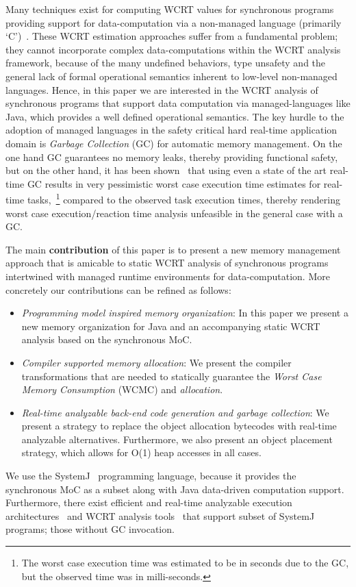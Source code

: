Many techniques exist for computing WCRT values for synchronous programs
providing support for data-computation via a non-managed language
(primarily `C')~\cite{boldt07,proop10}. These WCRT estimation approaches
suffer from a fundamental problem; they cannot incorporate complex
data-computations within the WCRT analysis framework, because of the
many undefined behaviors, type unsafety and the general lack of formal
operational semantics inherent to low-level non-managed
languages. Hence, in this paper we are interested in the WCRT analysis
of synchronous programs that support data computation via
managed-languages like Java, which provides a well defined operational
semantics. The key hurdle to the adoption of managed languages in the
safety critical hard real-time application domain is \textit{Garbage
  Collection} (GC) for automatic memory management. On the one hand GC
guarantees no memory leaks, thereby providing functional safety, but on
the other hand, it has been shown~\cite{puffitsch2013design} that using
even a state of the art real-time GC results in very pessimistic worst
case execution time estimates for real-time tasks,~\footnote{The worst
  case execution time was estimated to be in seconds due to the GC, but
  the observed time was in milli-seconds.} compared to the observed task
execution times, thereby rendering worst case execution/reaction time
analysis unfeasible in the general case with a GC.

The main \textbf{contribution} of this paper is to present a new memory
management approach that is amicable to static WCRT analysis of
synchronous programs intertwined with managed runtime environments for
data-computation. More concretely our contributions can be refined as
follows:

\begin{itemize}
\item \textit{Programming model inspired memory organization}: In this
  paper we present a new memory organization for Java and an
  accompanying static WCRT analysis based on the synchronous MoC.
\item \textit{Compiler supported memory allocation}: We present the
  compiler transformations that are needed to statically guarantee the
  \textit{Worst Case Memory Consumption} (WCMC) and \textit{allocation}.
\item \textit{Real-time analyzable back-end code generation and garbage
    collection}: We present a strategy to replace the object allocation
  bytecodes with real-time analyzable alternatives. Furthermore, we also
  present an object placement strategy, which allows for O(1) heap
  accesses in all cases.
\end{itemize}

We use the SystemJ~\cite{amal10} programming language, because it
provides the synchronous MoC as a subset along with Java data-driven
computation support. Furthermore, there exist efficient and real-time
analyzable execution architectures~\cite{nadeem2011rjop} and WCRT
analysis tools~\cite{LiMS14} that support subset of SystemJ programs;
those without GC invocation.


